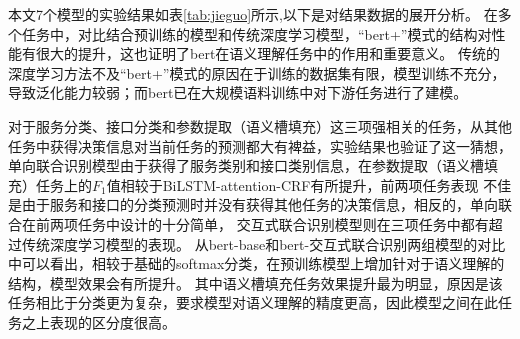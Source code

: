 本文7个模型的实验结果如表\ref{tab:jieguo}所示,以下是对结果数据的展开分析。
在多个任务中，对比结合预训练的模型和传统深度学习模型，“bert+”模式的结构对性能有很大的提升，这也证明了bert在语义理解任务中的作用和重要意义。
传统的深度学习方法不及“bert+”模式的原因在于训练的数据集有限，模型训练不充分，导致泛化能力较弱；而bert已在大规模语料训练中对下游任务进行了建模。

对于服务分类、接口分类和参数提取（语义槽填充）这三项强相关的任务，从其他任务中获得决策信息对当前任务的预测都大有裨益，实验结果也验证了这一猜想，
单向联合识别模型由于获得了服务类别和接口类别信息，在参数提取（语义槽填充）任务上的$F_1$值相较于BiLSTM-attention-CRF有所提升，前两项任务表现
不佳是由于服务和接口的分类预测时并没有获得其他任务的决策信息，相反的，单向联合在前两项任务中设计的十分简单，
交互式联合识别模型则在三项任务中都有超过传统深度学习模型的表现。
从bert-base和bert-交互式联合识别两组模型的对比中可以看出，相较于基础的softmax分类，在预训练模型上增加针对于语义理解的结构，模型效果会有所提升。
其中语义槽填充任务效果提升最为明显，原因是该任务相比于分类更为复杂，要求模型对语义理解的精度更高，因此模型之间在此任务之上表现的区分度很高。

